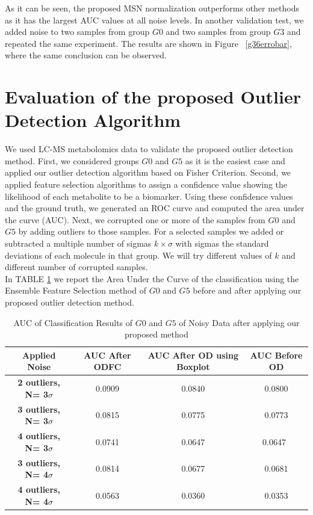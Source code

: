 As it can be seen, the proposed MSN normalization outperforms other methods as it has the largest AUC values at all noise levels.
In another validation test, we added noise to two samples from group $G0$ and two samples from group $G3$ and repeated the same experiment. The results are shown in Figure ~\ref{g36errobar}, where the same conclusion can be observed.

\section{Evaluation of the proposed Outlier Detection Algorithm}

We used LC-MS metabolomics data to validate the proposed outlier detection method. First, we considered groups $G0$ and $G5$ as it is the easiest case and applied our outlier detection algorithm based on Fisher Criterion. Second, we applied feature selection algorithms to assign a confidence value showing the likelihood of each metabolite to be a biomarker. Using these confidence values and the ground truth, we generated an ROC curve and computed the area under the curve (AUC). Next, we corrupted one or more of the samples from $G0$ and $G5$ by adding outliers to those samples. For a selected samples we added or subtracted a multiple number of sigmas $ k \times \sigma$ with sigmas the standard deviations of each molecule in that group. We will try different values of $k$ and different number of corrupted samples. \\
\indent In TABLE \ref{fld} we report the Area Under the Curve of the classification using the Ensemble Feature Selection method \cite{ali} of $G0$ and $G5$ before and after applying our proposed outlier detection method. 

\begin{table}[h!]
	\centering
	\caption{AUC of Classification Results of $G0$ and $G5$ of Noisy Data after applying our proposed method}
	\begin{tabular}{|c|c|c|c|} 
		\hline
		\textbf{Applied Noise} & \textbf{AUC After ODFC} & \textbf{AUC After OD using Boxplot} &	\textbf{AUC Before OD} \\ [0.5ex] 
		\hline\hline
		\textbf{2 outliers, N= 3$\sigma$
		} & 0.0909 & 0.0840 & 0.0800 \\
		\hline
		\textbf{3 outliers, N= 3$\sigma$
		} & 0.0815 & 0.0775 & 0.0773 \\
		\hline
		\textbf{4 outliers, N= 3$\sigma$} & 0.0741 & 0.0647 & 0.0647\ \\
		
		\hline
		\textbf{3 outliers, N= 4$\sigma$} & 0.0814 & 0.0677 & 0.0681\\
		\hline
		\textbf{4 outliers, N= 4$\sigma$} & 0.0563 & 0.0360 & 0.0353 \\ 
		\hline
	\end{tabular}
	\label{fld}
\end{table}


